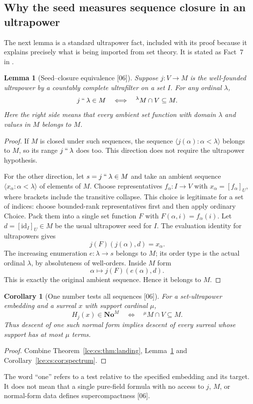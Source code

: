 \documentclass[11pt,letterpaper]{article}
\numberwithin{equation}{section}
\newtheorem{lemma}[theorem]{Lemma}
\newtheorem{corollary}[theorem]{Corollary}
\theoremstyle{definition}
\theoremstyle{remark}
\newcommand{\No}{\mathbf{No}}
\newcommand{\imset}[2]{#1\mathbin{``}#2}
\newcommand{\thref}[1]{Theorem~\ref{#1}}
\newcommand{\leref}[1]{Lemma~\ref{#1}}
\newcommand{\src}[1]{\textup{\textsf{\small[#1]}}}%
\begin{document}
\subsection{Why the seed measures sequence closure in an ultrapower}
The next lemma is a standard ultrapower fact, included with its proof
because it explains precisely what is being imported from set theory. It is
stated as Fact~7 in \cite{Williams}.

\begin{lemma}[Seed--closure equivalence \src{06}]\label{lce:cs:lem:seed-closure}
Suppose $j:V\to M$ is the well-founded ultrapower by a countably complete
ultrafilter on a set $I$. For any ordinal $\lambda$,
\begin{equation}\label{lce:cs:eq:seed-closure}
 \imset j\lambda\in M\quad\Longleftrightarrow\quad
 {}^\lambda M\cap V\subseteq M.
\end{equation}
Here the right side means that every ambient set function with domain
$\lambda$ and values in $M$ belongs to $M$.
\end{lemma}
\begin{proof}
If $M$ is closed under such sequences, the sequence
$\langle j(\alpha):\alpha<\lambda\rangle$ belongs to $M$, so its range
$\imset j\lambda$ does too. This direction does not require the ultrapower
hypothesis.

For the other direction, let $s=\imset j\lambda\in M$ and take an ambient
sequence $\langle x_\alpha:\alpha<\lambda\rangle$ of elements of $M$. Choose
representatives $f_\alpha:I\to V$ with $x_\alpha=[f_\alpha]_U$, where
brackets include the transitive collapse. This choice is legitimate for a
set of indices: choose bounded-rank representatives first and then apply
ordinary Choice. Pack them into a single set function $F$ with
$F(\alpha,i)=f_\alpha(i)$. Let $d=[\mathrm{id}_I]_U\in M$ be the usual
ultrapower seed for $I$. The evaluation identity for ultrapowers gives
\[
 j(F)(j(\alpha),d)=x_\alpha.
\]
The increasing enumeration $e:\lambda\to s$ belongs to $M$; its order type
is the actual ordinal $\lambda$, by absoluteness of well-orders. Inside $M$
form
\[
 \alpha\longmapsto j(F)(e(\alpha),d).
\]
This is exactly the original ambient sequence. Hence it belongs to $M$.
\end{proof}

\begin{corollary}[One number tests all sequences \src{06}]\label{lce:cs:cor:one-number}
For a set-ultrapower embedding and a surreal $x$ with support cardinal
$\mu$,
\[
 H_j(x)\in\No^M\quad\Longleftrightarrow\quad{}^\mu M\cap V\subseteq M.
\]
Thus descent of one such normal form implies descent of every surreal whose
support has at most $\mu$ terms.
\end{corollary}
\begin{proof}
Combine \thref{lce:cs:thm:landing}, \leref{lce:cs:lem:seed-closure} and
Corollary~\ref{lce:cs:cor:spectrum}.
\end{proof}
The word ``one'' refers to a test relative to the specified embedding and
its target. It does not mean that a single pure-field formula with no
access to $j$, $M$, or normal-form data defines supercompactness \src{06}.
\end{document}
